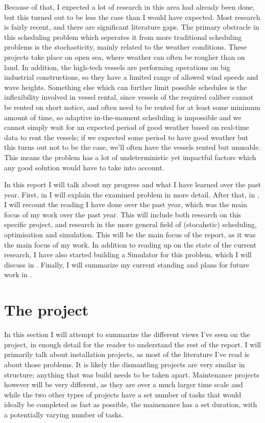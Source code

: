 \documentclass[a4paper,12pt]{article}
\begin{document}
Because of that, I expected a lot of research in this area had already been done, but this turned out to be less the case than I would have expected. Most research is fairly recent, and there are significant literature gaps. The primary obstracle in this scheduling problem which seperates it from more traditional scheduling problems is the stochasticity, mainly related to the weather conditions. These projects take place on open sea, where weather can often be rougher than on land. In addition, the high-tech vessels are performing operations on big industrial constructions, so they have a limited range of allowed wind speeds and wave heights. Something else which can further limit possible schedules is the inflexibility involved in vessel rental, since vessels of the required caliber cannot be rented on short notice, and often need to be rented for at least some minimum amount of time, so adaptive in-the-moment scheduling is impossible and we cannot simply wait for an expected period of good weather based on real-time data to rent the vessels; if we expected some period to have good weather but this turns out not to be the case, we'll often have the vessels rented but unusable. This means the problem has a lot of undeterministic yet impactful factors which any good solution would have to take into account. 

In this report I will talk about my progress and what I have learned over the past year. First, in  I will explain the examined problem in more detail. After that, in , I will recount the reading I have done over the past year, which was the main focus of my work over the past year. This will include both research on this specific project, and research in the more general field of (stocahstic) scheduling, optimisation and simulation. This will be the main focus of the report, as it was the main focus of my work. In addition to reading up on the state of the current research, I have also started building a Simulator for this problem, which I will discuss in . Finally, I will summarize my current standing and plans for future work in . 

\pagebreak

\section{The project} \label{s:project}
In this section I will attempt to summarize the different views I've seen on the project, in enough detail for the reader to understand the rest of the report. I will primarily talk about installation projects, as most of the literature I've read is about those problems. It is likely the dismantling projects are very similar in structure; anything that was build needs to be taken apart. Maintenance projects however will be very different, as they are over a much larger time scale and while the two other types of projects have a set number of tasks that would ideally be completed as fast as possible, the mainenance has a set duration, with a potentially varying number of tasks.
\end{document}

